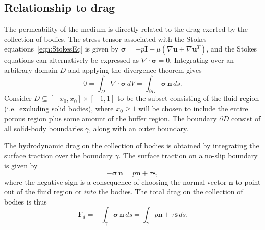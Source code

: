 \documentclass[3p]{elsarticle}
\newcommand{\grad}{{\nabla}}
\newcommand{\nn}{{\mathbf{n}}}
\renewcommand{\ss}{{\mathbf{s}}}
\newcommand{\uu}{{\mathbf{u}}}
\newcommand{\bvec}[1]{\mathbf{#1}}
\newcommand {\bq} {\bvec{q}}
\newcommand{\qavg}{\bar{q}}
\newcommand{\stress}{{\boldsymbol \sigma}}
\newcommand{\FD}{\bvec{F}_d}
\begin{document}
 

\subsection{Relationship to drag}

The permeability of the medium is directly related to the drag exerted by the collection of bodies. The stress tensor associated with the Stokes equations~\eqref{eqn:StokesEq} is given by $\stress = -p \bvec{I} + \mu \left( \grad \uu + \grad \uu^T \right)$, and the Stokes equations can alternatively be expressed as $\grad \cdot \stress = 0$. Integrating over an arbitrary domain $D$ and applying the divergence theorem gives
\begin{equation}
  \label{divthm}
  0 = \int_{D} \grad \cdot \stress \, dV
  = \int_{\partial D} \stress \, \nn \, ds.
\end{equation}
Consider $D \subseteq [-x_0, x_0] \times [-1, 1]$ to be the subset consisting of the fluid region (i.e.~excluding solid bodies), where $x_0 \ge 1$ will be chosen to include the entire porous region plus some amount of the buffer region. The boundary $\partial D$ consist of all solid-body boundaries $\gamma$, along with an outer boundary. 

The hydrodynamic drag on the collection of bodies is obtained by integrating the surface traction over the boundary $\gamma$. The surface traction on a no-slip boundary is given by 
\begin{equation}
  - \stress \, \nn = p \nn + \tau \ss,
\end{equation}
where the negative sign is a consequence of choosing the normal vector $\nn$ to point out of the fluid region or {\em into} the bodies. The total drag on the collection of bodies is thus
\begin{equation}
  \label{eqn:drag}
  \FD =  - \int_{\gamma} \stress \, \nn \, ds 
  = \int_{\gamma} p \nn + \tau \ss \, ds.
\end{equation}

\end{document}
